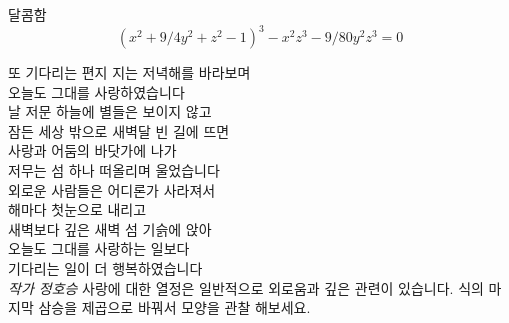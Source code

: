 \begin{surferPage}{달콤함}
\smallskip
\[(x^2+ 9/4y^2	+ z^2- 1)^3- x^2z^3	- 9/80y^2z^3	= 0\]

\singlespacing
또 기다리는 편지
\singlespacing
지는 저녁해를 바라보며\\
오늘도 그대를 사랑하였습니다\\
날 저문 하늘에 별들은 보이지 않고\\
잠든 세상 밖으로 새벽달 빈 길에 뜨면\\
사랑과 어둠의 바닷가에 나가\\
저무는 섬 하나 떠올리며 울었습니다\\
외로운 사람들은 어디론가 사라져서\\
해마다 첫눈으로 내리고\\
새벽보다 깊은 새벽 섬 기슭에 앉아\\
오늘도 그대를 사랑하는 일보다\\
기다리는 일이 더 행복하였습니다\\
{\it 작가 정호승}
\singlespacing 
사랑에 대한 열정은 일반적으로 외로움과 깊은 관련이 있습니다. 
\singlespacing 
식의 마지막 삼승을 제곱으로 바꿔서 모양을 관찰 해보세요.
\end{surferPage}
